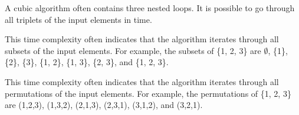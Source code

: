 \par {} A cubic algorithm often contains three nested loops. It is possible to go through all triplets of the input elements in  time.

\par {} This time complexity often indicates that the algorithm iterates through all subsets of the input elements. For example, the subsets of \{1, 2, 3\} are $\emptyset$, \{1\}, \{2\}, \{3\}, \{1, 2\}, \{1, 3\}, \{2, 3\}, and \{1, 2, 3\}.

\par {} This time complexity often indicates that the algorithm iterates through all permutations of the input elements. For example, the permutations of \{1, 2, 3\} are (1,2,3), (1,3,2), (2,1,3), (2,3,1), (3,1,2), and (3,2,1).